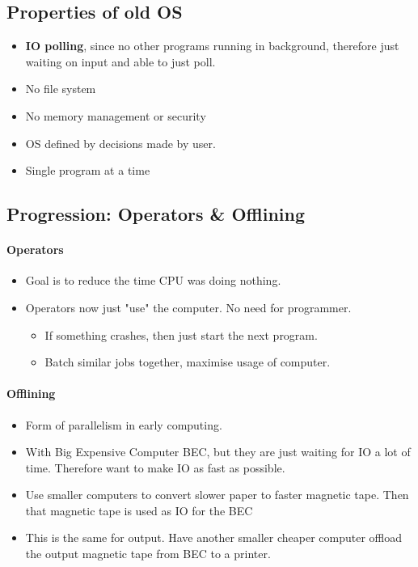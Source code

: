 \documentclass{article}
\newcommand\tab[1][0.5cm]{\hspace*{#1}}
\begin{document}
	\subsection{Properties of old OS}
		\begin{itemize}
			\item \textbf{IO polling}, since no other programs running in background, therefore just waiting on input and able to just poll.
			\item No file system
			\item No memory management or security
			\item OS defined by decisions made by user.
			\item Single program at a time
		\end{itemize}

	\subsection{Progression: Operators \& Offlining}
		\paragraph{\tab Operators}
		\begin{itemize}
			\item Goal is to reduce the time CPU was doing nothing.
			\item Operators now just "use" the computer. No need for programmer.
			\begin{itemize}
				\item If something crashes, then just start the next program.
				\item Batch similar jobs together, maximise usage of computer.
			\end{itemize}
		\end{itemize}

		\paragraph{\tab Offlining}
		\begin{itemize}
			\item Form of parallelism in early computing.
			\item With Big Expensive Computer BEC, but they are just waiting for IO a lot of time. Therefore want to make IO as fast as possible.
			\item Use smaller computers to convert slower paper to faster magnetic tape. Then that magnetic tape is used as IO for the BEC
			\item This is the same for output. Have another smaller cheaper computer offload the output magnetic tape from BEC to a printer.
		\end{itemize}
\end{document}
